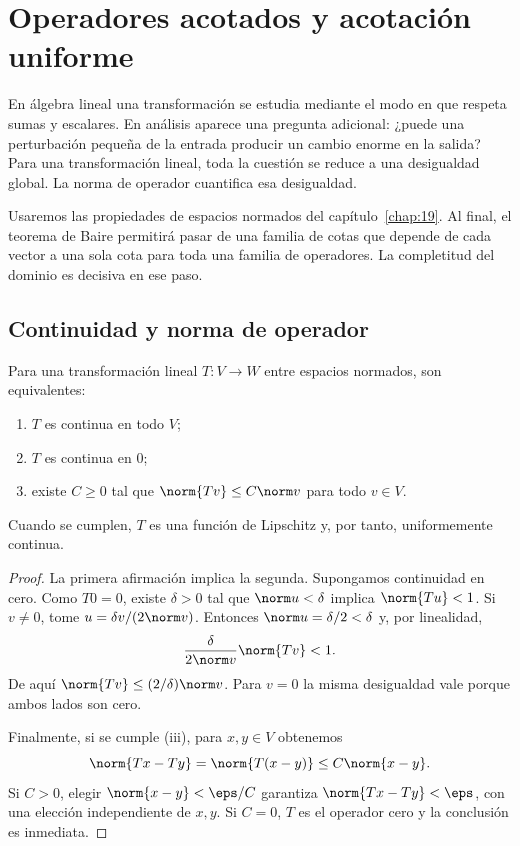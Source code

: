 \chapter{Operadores acotados y acotación uniforme}\label{chap:20}

En álgebra lineal una transformación se estudia mediante el modo en que respeta sumas y escalares. En análisis aparece una pregunta adicional: ¿puede una perturbación pequeña de la entrada producir un cambio enorme en la salida? Para una transformación lineal, toda la cuestión se reduce a una desigualdad global. La norma de operador cuantifica esa desigualdad.

Usaremos las propiedades de espacios normados del capítulo~\ref{chap:19}. Al final, el teorema de Baire permitirá pasar de una familia de cotas que depende de cada vector a una sola cota para toda una familia de operadores. La completitud del dominio es decisiva en ese paso.

\section{Continuidad y norma de operador}

\begin{teorema}\label{ch20:acotado}
Para una transformación lineal $T:V\to W$ entre espacios normados, son equivalentes:
\begin{enumerate}[label=(\roman*)]
\item $T$ es continua en todo $V$;
\item $T$ es continua en $0$;
\item existe $C\geq0$ tal que $\norm{Tv}\leq C\norm v$ para todo $v\in V$.
\end{enumerate}
Cuando se cumplen, $T$ es una función de Lipschitz y, por tanto, uniformemente continua.
\end{teorema}
\begin{proof}
La primera afirmación implica la segunda. Supongamos continuidad en cero. Como $T0=0$, existe $\delta>0$ tal que $\norm u<\delta$ implica $\norm{Tu}<1$. Si $v\ne0$, tome $u=\delta v/(2\norm v)$. Entonces $\norm u=\delta/2<\delta$ y, por linealidad,
\[
 \frac\delta{2\norm v}\norm{Tv}<1.
\]
De aquí $\norm{Tv}\leq (2/\delta)\norm v$. Para $v=0$ la misma desigualdad vale porque ambos lados son cero.

Finalmente, si se cumple (iii), para $x,y\in V$ obtenemos
\[
 \norm{Tx-Ty}=\norm{T(x-y)}\leq C\norm{x-y}.
\]
Si $C>0$, elegir $\norm{x-y}<\eps/C$ garantiza $\norm{Tx-Ty}<\eps$, con una elección independiente de $x,y$. Si $C=0$, $T$ es el operador cero y la conclusión es inmediata.
\end{proof}

